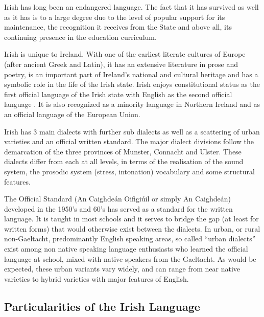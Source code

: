 \begin{multicols}{2}
Irish has long been an endangered language. The fact that it has survived as well as it has is to a large degree due to the level of popular support for its maintenance, the recognition it receives from the State and above all, its continuing presence in the education curriculum.


Irish is unique to Ireland. With one of the earliest literate cultures of Europe (after ancient Greek and Latin), it has an extensive literature in prose and poetry, is an important part of  Ireland’s national and cultural heritage and has a symbolic role in the life of the Irish state. Irish enjoys constitutional status as the first official language of the Irish state with English as the second official language \cite{govtstatement06,20yearstrategy}. It is also recognized as a minority language in Northern Ireland and as an official language of the European Union.

Irish has 3 main dialects with further sub dialects as well as a scattering of urban varieties and an official written standard. The major dialect divisions follow the demarcation of the three provinces of Munster, Connacht and Ulster. These dialects differ from each at all levels, in terms of the realisation of the sound system,  the prosodic system (stress, intonation) vocabulary and some structural features. 

The Official Standard (An Caighdeán Oifigiúil or simply An Caighdeán) developed in the 1950’s and 60’s has served as a standard for the written language. It is taught in most schools and it serves to bridge the gap (at least for written forms) that would otherwise exist between the dialects. In urban, or rural non-Gaeltacht, predominantly English speaking areas, so called ``urban dialects'' exist among non native speaking language enthusiasts who learned the official language at school, mixed with native speakers from the Gaeltacht. As would be expected, these urban variants vary widely, and can range from near native varieties to hybrid varieties with major features of English. 



\subsection{Particularities of the Irish Language}
\label{AboutIrish_en}


\end{multicols}
